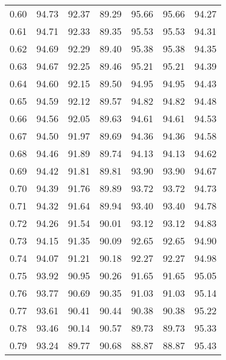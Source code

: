 \begin{tabular}{|c|c|c|c|c|c|c|}
      0.60 &     94.73 &     92.37 &      89.29 &   95.66 &      95.66 &         94.27 \\
      0.61 &     94.71 &     92.33 &      89.35 &   95.53 &      95.53 &         94.31 \\
      0.62 &     94.69 &     92.29 &      89.40 &   95.38 &      95.38 &         94.35 \\
      0.63 &     94.67 &     92.25 &      89.46 &   95.21 &      95.21 &         94.39 \\
      0.64 &     94.60 &     92.15 &      89.50 &   94.95 &      94.95 &         94.43 \\
      0.65 &     94.59 &     92.12 &      89.57 &   94.82 &      94.82 &         94.48 \\
      0.66 &     94.56 &     92.05 &      89.63 &   94.61 &      94.61 &         94.53 \\
      0.67 &     94.50 &     91.97 &      89.69 &   94.36 &      94.36 &         94.58 \\
      0.68 &     94.46 &     91.89 &      89.74 &   94.13 &      94.13 &         94.62 \\
      0.69 &     94.42 &     91.81 &      89.81 &   93.90 &      93.90 &         94.67 \\
      0.70 &     94.39 &     91.76 &      89.89 &   93.72 &      93.72 &         94.73 \\
      0.71 &     94.32 &     91.64 &      89.94 &   93.40 &      93.40 &         94.78 \\
      0.72 &     94.26 &     91.54 &      90.01 &   93.12 &      93.12 &         94.83 \\
      0.73 &     94.15 &     91.35 &      90.09 &   92.65 &      92.65 &         94.90 \\
      0.74 &     94.07 &     91.21 &      90.18 &   92.27 &      92.27 &         94.98 \\
      0.75 &     93.92 &     90.95 &      90.26 &   91.65 &      91.65 &         95.05 \\
      0.76 &     93.77 &     90.69 &      90.35 &   91.03 &      91.03 &         95.14 \\
      0.77 &     93.61 &     90.41 &      90.44 &   90.38 &      90.38 &         95.22 \\
      0.78 &     93.46 &     90.14 &      90.57 &   89.73 &      89.73 &         95.33 \\
      0.79 &     93.24 &     89.77 &      90.68 &   88.87 &      88.87 &         95.43 \\

\end{tabular}
